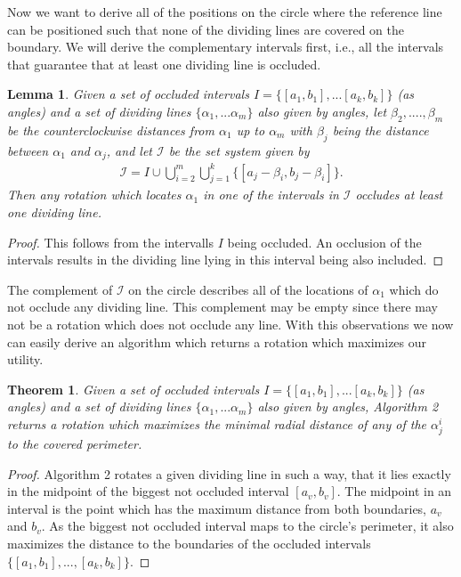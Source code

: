 \documentclass[a4paper,11pt]{article}
\newtheorem{theorem}{Theorem}
\newtheorem{lemma}{Lemma}
\begin{document}
Now we want to derive all of the positions on the circle where the reference line can be positioned such that none of the dividing lines are covered on the boundary. We will derive the complementary intervals first, i.e., all the intervals that guarantee that at least one dividing line is occluded.

\begin{lemma}
  Given a set of occluded intervals $I=\{[a_1,b_1],...[a_k,b_k]\}$ (as angles) and a set of dividing lines $\{\alpha_1,...\alpha_m\}$ also given by angles, let $\beta_2,....,\beta_m$ be the counterclockwise distances from $\alpha_1$ up to $\alpha_m$ with $\beta_j$ being the distance between $\alpha_1$ and $\alpha_j$, and let $\mathcal{I}$ be the set system given by
  \begin{align*}
    \mathcal{I}=I \cup \bigcup_{i=2}^m    \bigcup_{j=1}^k \{ [a_j-\beta_i,b_j-\beta_i]   \}.
  \end{align*}
  Then any rotation which locates $\alpha_1$ in one of the intervals in $\mathcal{I}$ occludes at least one dividing line.
\end{lemma}

\begin{proof}
  This follows from the intervalls $I$ being occluded. An occlusion of the intervals results in the dividing line lying in this interval being also included.
\end{proof}

The complement of $\mathcal{I}$ on the circle describes all of the locations of $\alpha_1$ which do not occlude any dividing line. This complement may be empty since there may not be a rotation which does not occlude any line. With this observations we now can easily derive an algorithm which returns a rotation which maximizes our utility.

\begin{theorem}
  Given a set of occluded intervals $I=\{[a_1,b_1],...[a_k,b_k]\}$ (as angles) and a set of dividing lines $\{\alpha_1,...\alpha_m\}$ also given by angles, Algorithm 2 returns a rotation which maximizes the minimal radial distance of any of the $\alpha^i_j$ to the covered perimeter.
\end{theorem}

\begin{proof}
  Algorithm 2 rotates a given dividing line in such a way, that it lies exactly in the midpoint of the biggest not occluded interval $[a_v, b_v]$. The midpoint in an interval is the point which has the maximum distance from both boundaries, $a_v$ and $b_v$. As the biggest not occluded interval maps to the circle's perimeter, it also maximizes the distance to the boundaries of the occluded intervals $\{[a_1, b_1], ..., [a_k, b_k]\}$.
\end{proof}
\end{document}

